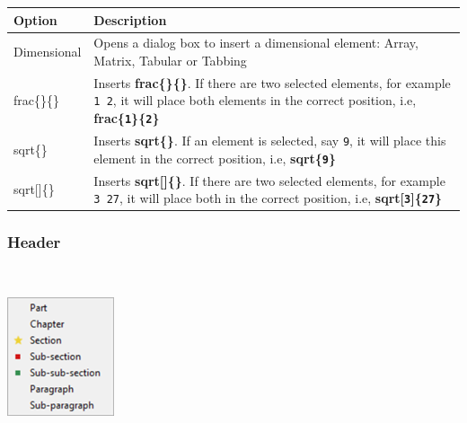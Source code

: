 \begin{scriptsize}\begin{tabularx}{\textwidth}{>{\hsize=0.2\hsize}X>{\hsize=0.8\hsize}X}\\
    \hline \textbf{Option} & \textbf{Description} \\
    \hline
    Dimensional & Opens a dialog box to insert a dimensional element: Array, Matrix, Tabular or Tabbing \\
    \hline
    frac\{\}\{\} & Inserts \textbf{frac\{\}\{\}}. If there are two selected elements, for example \texttt{1 2}, it will place both elements in the correct position, i.e, \textbf{frac\{\texttt{1}\}\{\texttt{2}\}} \\
    sqrt\{\} & Inserts \textbf{sqrt\{\}}. If an element is selected, say \texttt{9}, it will place this element in the correct position, i.e, \textbf{sqrt\{\texttt{9}\}} \\
    sqrt[]\{\} & Inserts \textbf{sqrt[]\{\}}. If there are two selected elements, for example \texttt{3 27}, it will place both in the correct position, i.e, \textbf{sqrt[\texttt{3}]\{\texttt{27}\}} \\
    \hline
  \end{tabularx}\end{scriptsize}


\newpage
\hypertarget{menu_insert_latex_header}{}
\subsubsection{Header}\\

\includegraphics[scale=0.50]{./res/menu_insert_latex_header.png}\\

